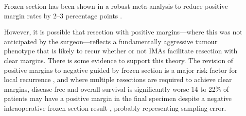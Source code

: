 Frozen section has been shown in a robust meta-analysis to reduce positive margin rates by 2--3 percentage points \cite{gorpheSystematicReviewMetaanalysis2019}.

However, it is possible that resection with positive margins---where this was not anticipated by the surgeon---reflects a fundamentally aggressive tumour phenotype that is likely to recur whether or not IMAs facilitate resection with clear margins.
There is some evidence to support this theory.
The revision of positive margins to negative guided by frozen section is a major risk factor for local recurrence \cite{PositiveFrozenSection2016}, and where multiple resections are required to achieve clear margins, disease-free and overall-survival is significantly worse \cite{mooreTransoralRoboticSurgery2018}
14 to 22\% of patients may have a positive margin in the final specimen despite a negative intraoperative frozen section result \cite{ordAccuracyFrozenSections1997, RefiningUtilityRole2016}, probably representing sampling error.
